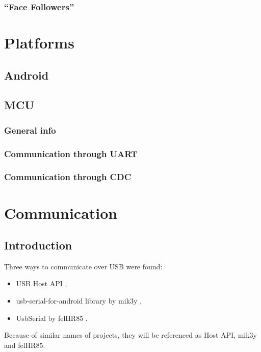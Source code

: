 \documentclass[openany]{mgr} %
\begin{document}
\subsection{``Face Followers''}


\chapter{Platforms}

\section{Android}

\section{MCU}
\subsection{General info}

\subsection{Communication through UART}
\subsection{Communication through CDC}

\chapter{Communication}

\section{Introduction}
Three ways to communicate over USB were found:
\begin{itemize}
  \item USB Host API \cite{android_reference},
  \item usb-serial-for-android library by mik3y \cite{mik3y},
  \item UsbSerial by felHR85 \cite{felHR85}.
\end{itemize}
Because of similar names of projects, they will be referenced as Host API, mik3y
and felHR85.
\end{document}
